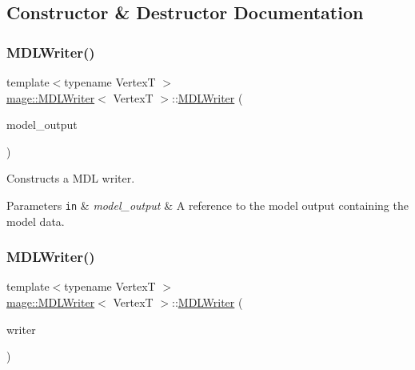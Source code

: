 \subsection{Constructor \& Destructor Documentation}
\hypertarget{classmage_1_1_m_d_l_writer_a7e5c6c9c9a9d32b09c5e17f4691e01c1}{}\label{classmage_1_1_m_d_l_writer_a7e5c6c9c9a9d32b09c5e17f4691e01c1} 
\subsubsection{\texorpdfstring{M\+D\+L\+Writer()}{MDLWriter()}\hspace{0.1cm}{\footnotesize\ttfamily [1/3]}}
{\footnotesize\ttfamily template$<$typename VertexT $>$ \\
\hyperlink{classmage_1_1_m_d_l_writer}{mage\+::\+M\+D\+L\+Writer}$<$ VertexT $>$\+::\hyperlink{classmage_1_1_m_d_l_writer}{M\+D\+L\+Writer} (\begin{DoxyParamCaption}\item[{const \hyperlink{structmage_1_1_model_output}{Model\+Output}$<$ VertexT $>$ \&}]{model\+\_\+output }\end{DoxyParamCaption})\hspace{0.3cm}{\ttfamily [explicit]}}

Constructs a M\+DL writer.


\begin{DoxyParams}[1]{Parameters}
\mbox{\tt in}  & {\em model\+\_\+output} & A reference to the model output containing the model data. \\
\hline
\end{DoxyParams}
\hypertarget{classmage_1_1_m_d_l_writer_ada4bed9d0ad947fd7039cdf9d8cc9698}{}\label{classmage_1_1_m_d_l_writer_ada4bed9d0ad947fd7039cdf9d8cc9698} 
\subsubsection{\texorpdfstring{M\+D\+L\+Writer()}{MDLWriter()}\hspace{0.1cm}{\footnotesize\ttfamily [2/3]}}
{\footnotesize\ttfamily template$<$typename VertexT $>$ \\
\hyperlink{classmage_1_1_m_d_l_writer}{mage\+::\+M\+D\+L\+Writer}$<$ VertexT $>$\+::\hyperlink{classmage_1_1_m_d_l_writer}{M\+D\+L\+Writer} (\begin{DoxyParamCaption}\item[{const \hyperlink{classmage_1_1_m_d_l_writer}{M\+D\+L\+Writer}$<$ VertexT $>$ \&}]{writer }\end{DoxyParamCaption})\hspace{0.3cm}{\ttfamily [delete]}}

